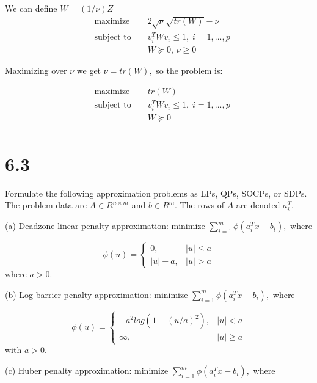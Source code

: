 \documentclass{article}
\begin{document}
We can define $W = (1 / \nu)Z$
\begin{align*}
&\text{maximize } && 2\sqrt{\nu}\sqrt{tr(W)} - \nu \\
&\text{subject to } 
&& v_i^T W v_i \leq 1, 
\; i = 1, ..., p  \\
& &&W \succeq 0, \, \nu \geq 0
\end{align*} 

Maximizing over $\nu$ we get $\nu = tr(W), $
so the problem is:

\begin{align*}
&\text{maximize } && tr(W) \\
&\text{subject to } 
&& v_i^T W v_i \leq 1, 
\; i = 1, ..., p  \\
& &&W \succeq 0\\
\end{align*} 

\section*{6.3}




Formulate the following approximation problems as LPs, QPs, SOCPs, or SDPs. The
problem data are $A \in R^{n \times m}$ and 
$b \in R^m.$ The rows of $A$ are denoted $a_i^T.$

(a) Deadzone-linear penalty approximation: minimize $\sum_{i = 1}^m \phi(a_i^T x - b_i),$ where 

$$
\phi(u) = 
\begin{cases}
0, & |u| \leq a \\
|u| - a, & |u| > a
\end{cases}
$$
where $a > 0.$

(b) Log-barrier penalty approximation: 
minimize $\sum_{i = 1}^m \phi(a_i^T x - b_i),$ where 

$$
\phi(u) = 
\begin{cases}
- a^2 log(1 - (u / a)^2), & |u| < a \\
\infty, & |u| \geq a
\end{cases}
$$
with $a > 0.$

(c) Huber penalty approximation: minimize 
 $\sum_{i = 1}^m \phi(a_i^T x - b_i),$ where 
\end{document}
